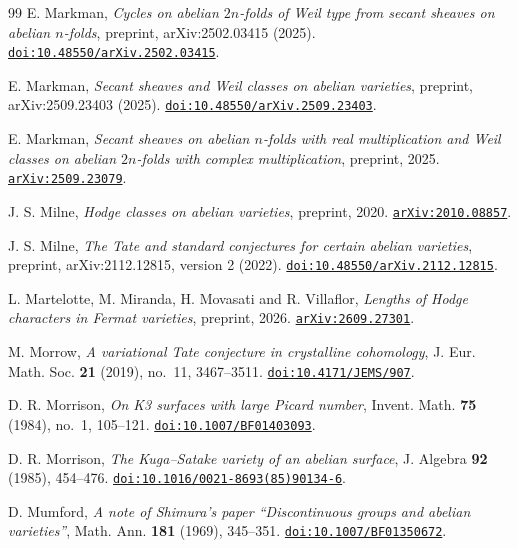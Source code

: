 \begin{thebibliography}{99}
E. Markman,
\emph{Cycles on abelian $2n$-folds of Weil type from secant sheaves on abelian
$n$-folds}, preprint, arXiv:2502.03415 (2025).
\href{https://doi.org/10.48550/arXiv.2502.03415}{\texttt{doi:10.48550/arXiv.2502.03415}}.

E. Markman,
\emph{Secant sheaves and Weil classes on abelian varieties},
preprint, arXiv:2509.23403 (2025).
\href{https://doi.org/10.48550/arXiv.2509.23403}{\texttt{doi:10.48550/arXiv.2509.23403}}.

E. Markman,
\emph{Secant sheaves on abelian $n$-folds with real multiplication and Weil
classes on abelian $2n$-folds with complex multiplication},
preprint, 2025.
\href{https://arxiv.org/abs/2509.23079}{\texttt{arXiv:2509.23079}}.

J. S. Milne,
\emph{Hodge classes on abelian varieties},
preprint, 2020.
\href{https://arxiv.org/abs/2010.08857}{\texttt{arXiv:2010.08857}}.

J. S. Milne,
\emph{The Tate and standard conjectures for certain abelian varieties},
preprint, arXiv:2112.12815, version 2 (2022).
\href{https://doi.org/10.48550/arXiv.2112.12815}{\texttt{doi:10.48550/arXiv.2112.12815}}.

L. Martelotte, M. Miranda, H. Movasati and R. Villaflor,
\emph{Lengths of Hodge characters in Fermat varieties},
preprint, 2026.
\href{https://arxiv.org/abs/2609.27301}{\texttt{arXiv:2609.27301}}.

M. Morrow,
\emph{A variational Tate conjecture in crystalline cohomology},
J. Eur. Math. Soc. \textbf{21} (2019), no.~11, 3467--3511.
\href{https://doi.org/10.4171/JEMS/907}{\texttt{doi:10.4171/JEMS/907}}.

D. R. Morrison,
\emph{On K3 surfaces with large Picard number},
Invent. Math. \textbf{75} (1984), no.~1, 105--121.
\href{https://doi.org/10.1007/BF01403093}{\texttt{doi:10.1007/BF01403093}}.

D. R. Morrison,
\emph{The Kuga--Satake variety of an abelian surface},
J. Algebra \textbf{92} (1985), 454--476.
\href{https://doi.org/10.1016/0021-8693(85)90134-6}%
{\texttt{doi:10.1016/0021-8693(85)90134-6}}.

D. Mumford,
\emph{A note of Shimura's paper ``Discontinuous groups and abelian
varieties''},
Math. Ann. \textbf{181} (1969), 345--351.
\href{https://doi.org/10.1007/BF01350672}{\texttt{doi:10.1007/BF01350672}}.


\end{thebibliography}

